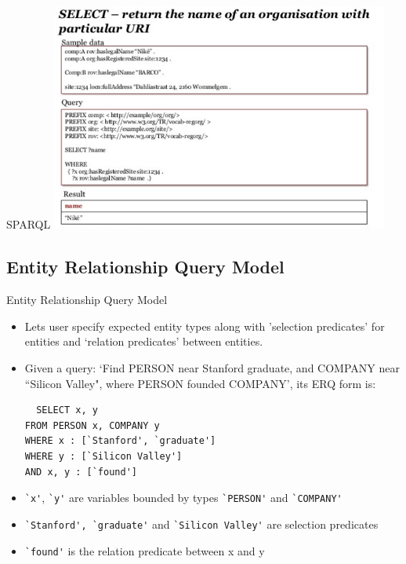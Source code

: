 \documentclass[pdf,11pt]{beamer}
\begin{document}
\begin{frame}{SPARQL}
\includegraphics[height=7.5cm]{./5.PNG}
\end{frame}


\subsection[ERQ Model]{Entity Relationship Query Model}

\begin{frame}[fragile]{Entity Relationship Query Model}

\begin{itemize}
  \item Lets user specify expected entity types along with 'selection predicates' for entities and `relation predicates' between entities.
  \pause
  \item Given a query: `Find PERSON near Stanford graduate, and
COMPANY near ``Silicon Valley", where PERSON founded
COMPANY', its ERQ form is:
  \pause
  \begin{verbatim}
  SELECT x, y
FROM PERSON x, COMPANY y
WHERE x : [`Stanford', `graduate']
WHERE y : [`Silicon Valley']
AND x, y : [`found']
\end{verbatim}
  \pause
  \item \verb|`x'|, \verb|`y'| are variables bounded by types \verb|`PERSON'| and
\verb|`COMPANY'|
  \pause
  \item \verb|`Stanford', `graduate'| and \verb|`Silicon Valley'| are selection predicates
  \pause
  \item \verb|`found'| is the relation predicate between x and y
\end{itemize}

\end{frame}
\end{document}
